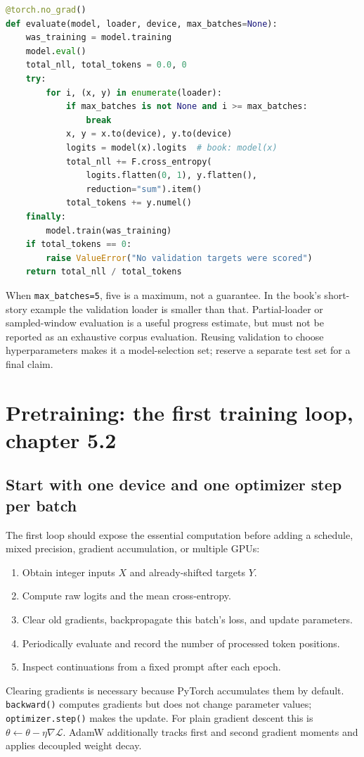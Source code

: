 \begin{lstlisting}[language=Python]
@torch.no_grad()
def evaluate(model, loader, device, max_batches=None):
    was_training = model.training
    model.eval()
    total_nll, total_tokens = 0.0, 0
    try:
        for i, (x, y) in enumerate(loader):
            if max_batches is not None and i >= max_batches:
                break
            x, y = x.to(device), y.to(device)
            logits = model(x).logits  # book: model(x)
            total_nll += F.cross_entropy(
                logits.flatten(0, 1), y.flatten(),
                reduction="sum").item()
            total_tokens += y.numel()
    finally:
        model.train(was_training)
    if total_tokens == 0:
        raise ValueError("No validation targets were scored")
    return total_nll / total_tokens
\end{lstlisting}

When \texttt{max\_batches=5}, five is a maximum, not a guarantee. In the book's
short-story example the validation loader is smaller than that. Partial-loader
or sampled-window evaluation is a useful progress estimate, but must not be
reported as an exhaustive corpus evaluation. Reusing validation to choose
hyperparameters makes it a model-selection set; reserve a separate test set for
a final claim.

\section{Pretraining: the first training loop, chapter 5.2}
\label{sec:basic-loop}

\subsection{Start with one device and one optimizer step per batch}
The first loop should expose the essential computation before adding a schedule,
mixed precision, gradient accumulation, or multiple GPUs:
\begin{enumerate}
\item Obtain integer inputs $X$ and already-shifted targets $Y$.
\item Compute raw logits and the mean cross-entropy.
\item Clear old gradients, backpropagate this batch's loss, and update parameters.
\item Periodically evaluate and record the number of processed token positions.
\item Inspect continuations from a fixed prompt after each epoch.
\end{enumerate}
Clearing gradients is necessary because PyTorch accumulates them by default.
\texttt{backward()} computes gradients but does not change parameter values;
\texttt{optimizer.step()} makes the update. For plain gradient descent this is
$\theta\leftarrow\theta-\eta\nabla\mathcal L$. AdamW additionally tracks first
and second gradient moments and applies decoupled weight decay.

